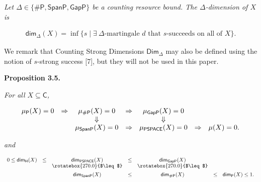 \documentclass[10pt,a4paper]{article}
\begin{document}
\emph{Let $\Delta\in\{{\mathsf{\#}\mathsf{P}},\mathsf{SpanP},\mathsf{GapP}\}$ be a counting resource bound.
The $\Delta$-dimension of $X$ is}\par


\[\begin{gathered}
{\mathsf{dim}}_{\Delta}(X)=\inf\{s\mid\exists\ \Delta\textrm{-martingale $d$ that $s$-succeeds on all of $X$}\}.
\end{gathered}\]






We remark that Counting Strong Dimensions ${\mathsf{Dim}}_{\Delta}$ may also be defined using the notion of $s$-strong success [7], but they will not be used in this paper.\par





\par\medskip\noindent\textbf{
\textbf{Proposition 3.5}\textbf{.}
}\par



\emph{For all $X\subseteq\mathsf{C}$,}\par


\[\begin{gathered}
\begin{array}[]{ccccccc}\mu_{\mathsf{P}}(X)=0&\Rightarrow&\mu_{{\mathsf{\#}\mathsf{P}}}(X)=0&\Rightarrow&\mu_{\mathsf{GapP}}(X)=0\\
&&\Downarrow&&\Downarrow\\
&&\mu_{\mathsf{SpanP}}(X)=0&\Rightarrow&\mu_{\mathsf{PSPACE}}(X)=0&\Rightarrow&\mu(X)=0.\end{array}
\end{gathered}\]


\emph{and}\par


\[\begin{gathered}
\begin{array}[]{ccccccc}0\leq{\mathsf{dim}}_{\mathsf{H}}(X)&\leq&{\mathsf{dim}}_{\mathsf{PSPACE}}(X)&\leq&{\mathsf{dim}}_{\mathsf{GapP}}(X)\\
&&\mathrel{\raisebox{4.30554pt}{\rotatebox{270.0}{$\leq$}}}&&\mathrel{\raisebox{4.30554pt}{\rotatebox{270.0}{$\leq$}}}\\
&&{\mathsf{dim}}_{\mathsf{SpanP}}(X)&\leq&{\mathsf{dim}}_{\mathsf{\#}\mathsf{P}}(X)&\leq&{\mathsf{dim}}_{\mathsf{P}}(X)\leq 1.\end{array}
\end{gathered}\]
\end{document}
